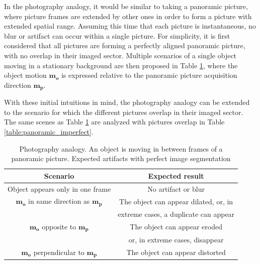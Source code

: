 In the photography analogy, it would be similar to taking a panoramic picture, where picture frames are extended by other ones in order to form a picture with extended spatial range. Assuming this time that each picture is instantaneous, no blur or artifact can occur within a single picture. For simplicity, it is first considered that all pictures are forming a perfectly aligned panoramic picture, with no overlap in their imaged sector. Multiple scenarios of a single object moving in a stationary background are then proposed in Table \ref{table:panoramic_perfect}, where the object motion $\boldsymbol{m_o}$ is expressed relative to the panoramic picture acquisition direction $\boldsymbol{m_p}$.

With these initial intuitions in mind, the photography analogy can be extended to the scenario for which the different pictures overlap in their imaged sector. The same scenes as Table \ref{table:panoramic_perfect} are analyzed with pictures overlap in Table \ref{table:panoramic_imperfect}.

\begin{table}[!ht]
\centering
\begin{tabular}{| c | c |}
  \hline
  \textbf{Scenario}  &   \textbf{Expected result} \\
  \hline
  Object appears only in one frame    &   No artifact or blur \\
  \hline
  $\boldsymbol{m_o}$ in same direction as $\boldsymbol{m_p}$  &  The object can appear dilated, or, in \\
    &  extreme cases, a duplicate can appear \\
  \hline
  $\boldsymbol{m_o}$ opposite to $\boldsymbol{m_p}$    &  The object can appear eroded   \\
    &   or, in extreme cases, disappear \\
  \hline
  $\boldsymbol{m_o}$ perpendicular to $\boldsymbol{m_p}$    &   The object can appear distorted \\
  \hline
 \end{tabular}
\caption{Photography analogy. An object is moving in between frames of a panoramic picture. Expected artifacts with perfect image segmentation}
\label{table:panoramic_perfect}
\end{table}


